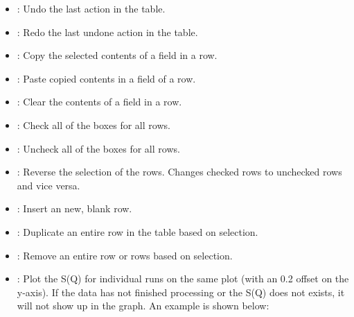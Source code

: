 \begin{itemize}

\item {}: Undo the last action in the table.
\item {}: Redo the last undone action in the table.
\item {}: Copy the selected contents of a field in a row.
\item {}: Paste copied contents in a field of a row.
\item {}: Clear the contents of a field in a row.
\item {}: Check all of the  boxes for all rows.
\item {}: Uncheck all of the  boxes for all rows.
\item {}: Reverse the selection of the rows. Changes checked rows to unchecked rows and vice versa.
\item {}: Insert an new, blank row.
\item {}: Duplicate an entire row in the table based on selection. 
\item {}: Remove an entire row or rows based on selection.
\item {}: Plot the S(Q) for individual runs on the same plot (with an 0.2 offset on the y-axis). If the data has not finished processing or the S(Q) does not exists, it will not show up in the graph. An example is shown below:

\noindent{}


\end{itemize}
